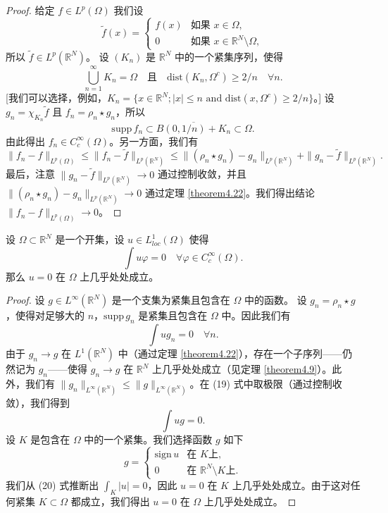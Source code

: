 \begin{proof}
给定 $f \in L^p(\Omega)$ 我们设
\[ \tilde{f}(x) = \begin{cases} f(x) & \text{如果 } x \in \Omega, \\ 0 & \text{如果 } x \in \mathbb{R}^N \setminus \Omega, \end{cases} \]
所以 $\tilde{f} \in L^p(\mathbb{R}^N)$。
设 $(K_n)$ 是 $\mathbb{R}^N$ 中的一个紧集序列，使得
\[ \bigcup_{n=1}^\infty K_n = \Omega \quad \text{且} \quad \mathrm{dist}(K_n, \Omega^c) \ge 2/n \quad \forall n. \]
[我们可以选择，例如，$K_n = \{x \in \mathbb{R}^N; |x| \le n \text{ and } \mathrm{dist}(x, \Omega^c) \ge 2/n\}$。]
设 $g_n = \chi_{K_n} \tilde{f}$ 且 $f_n = \rho_n \star g_n$，所以
\[ \mathrm{supp}\,f_n \subset \overline{B(0,1/n) + K_n} \subset \Omega. \]
由此得出 $f_n \in C_c^\infty(\Omega)$。另一方面，我们有
\[ \|f_n - f\|_{L^p(\Omega)} \le \|f_n - \tilde{f}\|_{L^p(\mathbb{R}^N)} \le \|(\rho_n \star g_n) - g_n\|_{L^p(\mathbb{R}^N)} + \|g_n - \tilde{f}\|_{L^p(\mathbb{R}^N)}. \]
最后，注意 $\|g_n - \tilde{f}\|_{L^p(\mathbb{R}^N)} \to 0$ 通过控制收敛，并且 $\|(\rho_n \star g_n) - g_n\|_{L^p(\mathbb{R}^N)} \to 0$ 通过定理 \ref{theorem4.22}。我们得出结论 $\|f_n - f\|_{L^p(\Omega)} \to 0$。
\end{proof}

\begin{corollary}\label{corollary4.24}
设 $\Omega \subset \mathbb{R}^N$ 是一个开集，设 $u \in L^1_{loc}(\Omega)$ 使得
\[ \int u \varphi = 0 \quad \forall \varphi \in C_c^\infty(\Omega). \]
那么 $u=0$ 在 $\Omega$ 上几乎处处成立。
\end{corollary}
\begin{proof}
设 $g \in L^\infty(\mathbb{R}^N)$ 是一个支集为紧集且包含在 $\Omega$ 中的函数。
设 $g_n = \rho_n \star g$，使得对足够大的 $n$，$\mathrm{supp}\,g_n$ 是紧集且包含在 $\Omega$ 中。因此我们有
\begin{equation}\label{eq:4.24_1_temp}
\int u g_n = 0 \quad \forall n. \tag{19}
\end{equation}
由于 $g_n \to g$ 在 $L^1(\mathbb{R}^N)$ 中（通过定理 \ref{theorem4.22}），存在一个子序列——仍然记为 $g_n$——使得 $g_n \to g$ 在 $\mathbb{R}^N$ 上几乎处处成立（见定理 \ref{theorem4.9}）。此外，我们有 $\|g_n\|_{L^\infty(\mathbb{R}^N)} \le \|g\|_{L^\infty(\mathbb{R}^N)}$。在 (19) 式中取极限（通过控制收敛），我们得到
\begin{equation}\label{eq:4.24_2_temp}
\int u g = 0. \tag{20}
\end{equation}
设 $K$ 是包含在 $\Omega$ 中的一个紧集。我们选择函数 $g$ 如下
\[ g = \begin{cases} \mathrm{sign}\,u & \text{在 } K \text{上}, \\ 0 & \text{在 } \mathbb{R}^N \setminus K \text{上}. \end{cases} \]
我们从 (20) 式推断出 $\int_K |u| = 0$，因此 $u=0$ 在 $K$ 上几乎处处成立。由于这对任何紧集 $K \subset \Omega$ 都成立，我们得出 $u=0$ 在 $\Omega$ 上几乎处处成立。
\end{proof}

